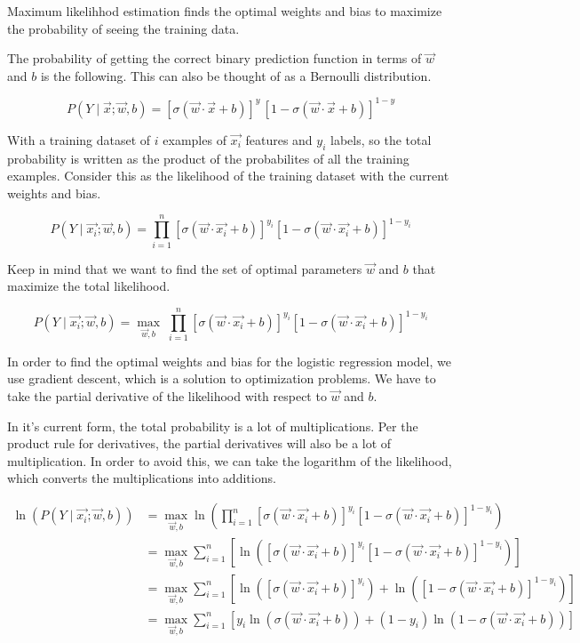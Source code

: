\documentclass[openany]{book}
\begin{document}
Maximum likelihhod estimation finds the optimal weights and bias to
maximize the probability of seeing the training data.

The probability of getting the correct binary prediction function in
terms of \(\vec{w}\) and \(b\) is the following. This can also be
thought of as a Bernoulli distribution.

\[
P(Y \mid \vec{x}; \vec{w}, b) =
\left[ \sigma(\vec{w} \cdot \vec{x} + b) \right]^{y} \,
\left[ 1 - \sigma(\vec{w} \cdot \vec{x} + b) \right]^{1 - y}
\]

With a training dataset of \(i\) examples of \(\vec{x_i}\) features and
\(y_i\) labels, so the total probability is written as the product of
the probabilites of all the training examples. Consider this as the
likelihood of the training dataset with the current weights and bias.

\[
P(Y \mid \vec{x_i}; \vec{w}, b) 
= \prod_{i=1}^{n}
\left[ \sigma(\vec{w} \cdot \vec{x_i} + b) \right]^{y_i}
\left[ 1 - \sigma(\vec{w} \cdot \vec{x_i} + b) \right]^{1 - y_i}
\]

Keep in mind that we want to find the set of optimal parameters
\(\vec{w}\) and \(b\) that maximize the total likelihood.

\[
P(Y \mid \vec{x_i}; \vec{w}, b) 
= \max_{\vec{w}, b} \;
\prod_{i=1}^{n}
\left[ \sigma(\vec{w} \cdot \vec{x_i} + b) \right]^{y_i}
\left[ 1 - \sigma(\vec{w} \cdot \vec{x_i} + b) \right]^{1 - y_i}
\]

    In order to find the optimal weights and bias for the logistic
regression model, we use gradient descent, which is a solution to
optimization problems. We have to take the partial derivative of the
likelihood with respect to \(\vec{w}\) and \(b\).

In it's current form, the total probability is a lot of multiplications.
Per the product rule for derivatives, the partial derivatives will also
be a lot of multiplication. In order to avoid this, we can take the
logarithm of the likelihood, which converts the multiplications into
additions.

\begin{align*}
\ln(P(Y \mid \vec{x_i}; \vec{w}, b)) &= \max_{\vec{w}, b} \ln(\prod_{i=1}^{n} [\sigma{(\vec{w} \cdot \vec{x_i} + b)}]^{y_i} [1 - \sigma{(\vec{w} \cdot \vec{x_i} + b)}]^{1-y_i}) \\
&= \max_{\vec{w}, b} \sum_{i=1}^{n}[ \ln([\sigma{(\vec{w} \cdot \vec{x_i} + b)}]^{y_i} [1 - \sigma{(\vec{w} \cdot \vec{x_i} + b)}]^{1-y_i})] \\
&= \max_{\vec{w}, b} \sum_{i=1}^{n}[ \ln([\sigma{(\vec{w} \cdot \vec{x_i} + b)}]^{y_i}) + \ln([1 - \sigma{(\vec{w} \cdot \vec{x_i} + b)}]^{1-y_i})] \\
&= \max_{\vec{w}, b} \sum_{i=1}^{n}[ y_i \ln(\sigma{(\vec{w} \cdot \vec{x_i} + b)}) + (1-y_i) \ln(1 - \sigma{(\vec{w} \cdot \vec{x_i} + b)})] \\
\end{align*}
\end{document}
